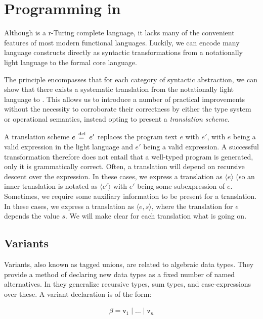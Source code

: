 
\chapter{Programming in \rfunc}\label{sec:prog}

Although \rfunc is a r-Turing complete language, it lacks many of the
convenient features of most modern functional languages. Luckily, we can encode
many language constructs directly as syntactic transformations from a
notationally light language to the formal core language.

The principle encompasses that for each category of syntactic abstraction, we
can show that there exists a systematic translation from the notationally light
language to \rfunc. This allows us to introduce a number of practical
improvements without the necessity to corroborate their correctness by either
the type system or operational semantics, instead opting to present a
\emph{translation scheme}.

A translation scheme $e \stackrel{\>\text{def}}{=}\> e'$ replaces the program text $e$ with $e'$,
with $e$ being a valid expression in the light language and $e'$ being a valid
\rfunc expression. A successful transformation therefore does not entail that a
well-typed program is generated, only it is grammatically correct. Often, a
translation will depend on recursive descent over the expression. In these
cases, we express a translation as $\langle e \rangle$ (so an inner translation
is notated as $\langle e' \rangle$ with $e'$ being some subexpression of $e$.
Sometimes, we require some auxiliary information to be present for a
translation. In these cases, we express a translation as $\langle e, s
\rangle$, where the translation for $e$ depends the value $s$. We will make
clear for each translation what is going on.

\section{Variants}\label{sec:variants}

Variants, also known as tagged unions, are related to algebraic data types.
They provide a method of declaring new data types as a fixed number of named
alternatives. In \rfunc they generalize recursive types, sum types, and
case-expressions over these. A variant declaration is of the form:

\begin{align*}
  \beta = \texttt{v}_1 \mid \dots \mid \texttt{v}_n
\end{align*}

